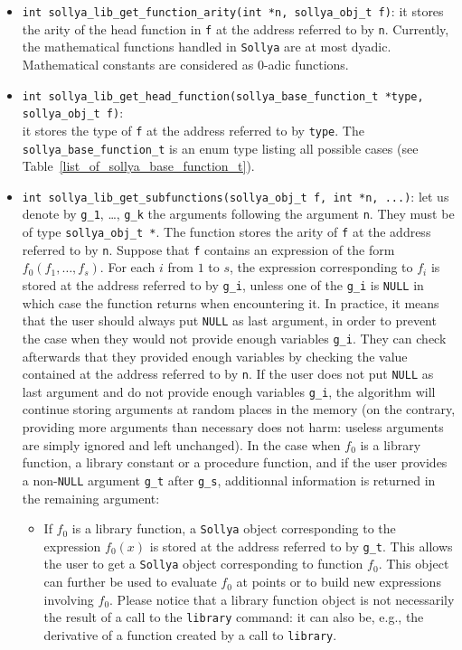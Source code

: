 \documentclass[a4paper]{article}
\newcommand{\sollya}{\texttt{Sollya}\xspace}
\begin{document}
\begin{itemize}
\item \verb|int sollya_lib_get_function_arity(int *n, sollya_obj_t f)|: it stores the arity of the head function in \texttt{f} at the address referred to by \texttt{n}. Currently, the mathematical functions handled in \sollya are at most dyadic. Mathematical constants are considered as 0-adic functions.
\item \verb|int sollya_lib_get_head_function(sollya_base_function_t *type, sollya_obj_t f)|:\\
it stores the type of \texttt{f} at the address referred to by \texttt{type}. The \texttt{sollya\_base\_function\_t} is an enum type listing all possible cases (see Table~\ref{list_of_sollya_base_function_t}).
\item \verb|int sollya_lib_get_subfunctions(sollya_obj_t f, int *n, ...)|: let us denote by \texttt{g\_1}, \dots, \texttt{g\_k} the arguments following the argument \texttt{n}. They must be of type \verb|sollya_obj_t *|. The function stores the arity of \texttt{f} at the address referred to by \texttt{n}. Suppose that \texttt{f} contains an expression of the form $f_0(f_1,\dots,f_s)$. For each $i$ from $1$ to $s$, the expression corresponding to $f_i$ is stored at the address referred to by \texttt{g\_i}, unless one of the \texttt{g\_i} is \texttt{NULL} in which case the function returns when encountering it. In practice, it means that the user should always put \texttt{NULL} as last argument, in order to prevent the case when they would not provide enough variables \texttt{g\_i}. They can check afterwards that they provided enough variables by checking the value contained at the address referred to by \texttt{n}. If the user does not put \texttt{NULL} as last argument and do not provide enough variables \texttt{g\_i}, the algorithm will continue storing arguments at random places in the memory (on the contrary, providing more arguments than necessary does not harm: useless arguments are simply ignored and left unchanged). In the case when $f_0$ is a library function, a library constant or a procedure function, and if the user provides a non-\texttt{NULL} argument \texttt{g\_t} after \texttt{g\_s}, additionnal information is returned in the remaining argument:
  \begin{itemize}
  \item If $f_0$ is a library function, a \sollya object corresponding to the expression $f_0(x)$ is stored at the address referred to by \texttt{g\_t}. This allows the user to get a \sollya object corresponding to function $f_0$. This object can further be used to evaluate $f_0$ at points or to build new expressions involving $f_0$. Please notice that a library function object is not necessarily the result of a call to the \verb|library| command: it can also be, e.g., the derivative of a function created by a call to \verb|library|.

\end{itemize}
\end{itemize}
\end{document}
